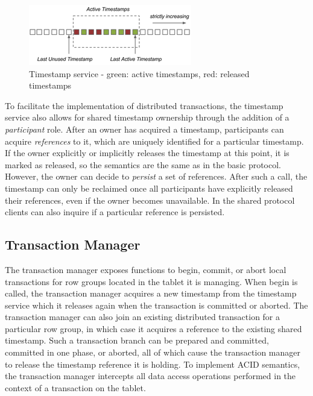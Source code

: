 \documentclass[10pt,final,journal]{IEEEtran}
\begin{document}
\begin{figure}[!t]
\centering
\hspace*{-.2in}
\includegraphics{images/ts-resized.png}
\caption{Timestamp service - green: active timestamps, red: released timestamps}
\label{ts}
\end{figure}

To facilitate the implementation of distributed transactions, the timestamp service also allows for shared timestamp ownership through the addition of a \emph{participant} role. After an owner has acquired a timestamp, participants can acquire \emph{references} to it, which are uniquely identified for a particular timestamp. If the owner explicitly or implicitly releases the timestamp at this point, it is marked as released, so the semantics are the same as in the basic protocol. However, the owner can decide to \emph{persist} a set of references. After such a call, the timestamp can only be reclaimed once all participants have explicitly released their references, even if the owner becomes unavailable. In the shared protocol clients can also inquire if a particular reference is persisted.

\subsection{Transaction Manager}
The transaction manager exposes functions to begin, commit, or abort local transactions for row groups located in the tablet it is managing. When begin is called, the transaction manager acquires a new timestamp from the timestamp service which it releases again when the transaction is committed or aborted. The transaction manager can also join an existing distributed transaction for a particular row group, in which case it acquires a reference to the existing shared timestamp. Such a transaction branch can be prepared and committed, committed in one phase, or aborted, all of which cause the transaction manager to release the timestamp reference it is holding. To implement ACID semantics, the transaction manager intercepts all data access operations performed in the context of a transaction on the tablet.
\end{document}
